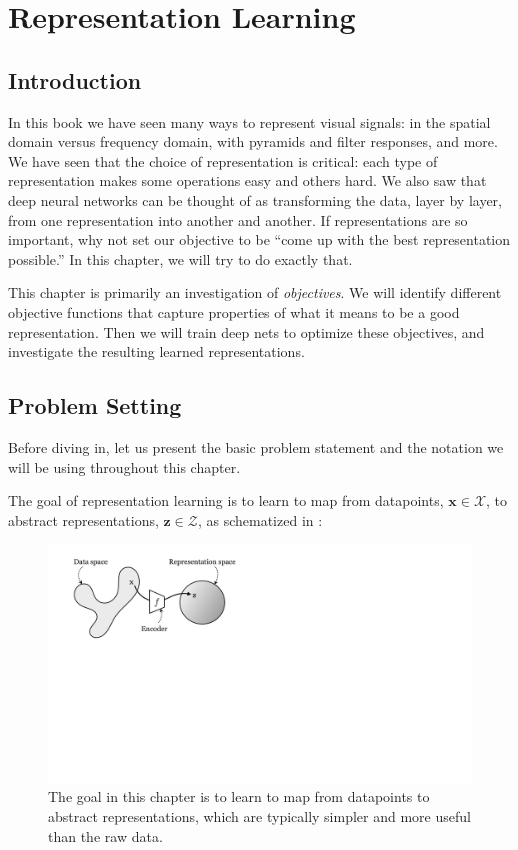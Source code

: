 \chapter{Representation Learning}\label{chapter:representation_learning}

\section{Introduction}
In this book we have seen many ways to represent visual signals: in the spatial domain versus frequency domain, with pyramids and filter responses, and more. We have seen that the choice of representation is critical: each type of representation makes some operations easy and others hard. We also saw that deep neural networks can be thought of as transforming the data, layer by layer, from one representation into another and another.%
If representations are so important, why not set our objective to be ``come up with the best representation possible.'' In this chapter, we will try to do exactly that.

This chapter is primarily an investigation of \textit{objectives}. We will identify different objective functions that capture properties of what it means to be a good representation. Then we will train deep nets to optimize these objectives, and investigate the resulting learned representations.

\section{Problem Setting}
Before diving in, let us present the basic problem statement and the notation we will be using throughout this chapter.

The goal of representation learning is to learn to map from datapoints, $\mathbf{x} \in \mathcal{X}$, to abstract representations, $\mathbf{z} \in \mathcal{Z}$, as schematized in \fig{\ref{fig:representation_learning:rep_learning_schematic}}:

\begin{figure}[h!]
    \centerline{
        \includegraphics[width=.52\linewidth]{figures/representation_learning/rep_learning_schematic.pdf}
    }
    \caption{The goal in this chapter is to learn to map from datapoints to abstract representations, which are typically simpler and more useful than the raw data.}\label{fig:representation_learning:rep_learning_schematic}
\end{figure}

